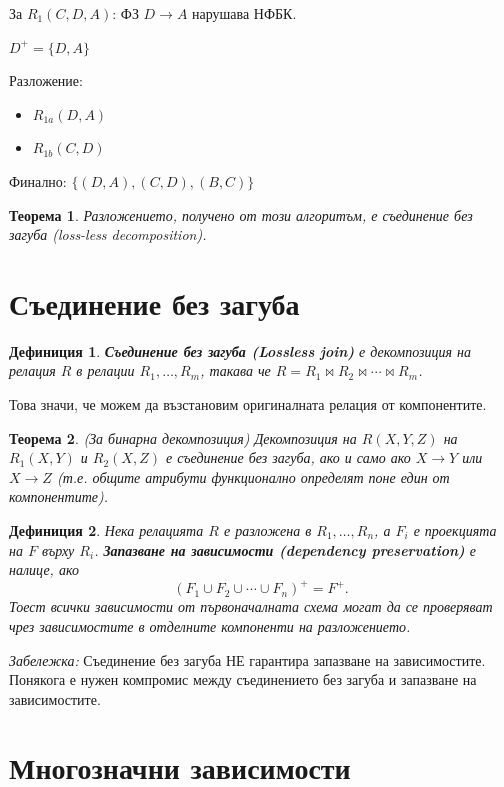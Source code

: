 \documentclass{scrartcl}
\newtheorem{definition}{Дефиниция}
\newtheorem{theorem}{Теорема}
\begin{document}
\begin{FlushLeft}
За $R_1(C, D, A)$: ФЗ $D \rightarrow A$ нарушава НФБК.

$D^+ = \{D, A\}$

Разложение:
\begin{itemize}
    \item $R_{1a}(D, A)$
    \item $R_{1b}(C, D)$
\end{itemize}

Финално: $\{(D, A), (C, D), (B, C)\}$

\begin{theorem}
Разложението, получено от този алгоритъм, е съединение без загуба (loss-less decomposition).
\end{theorem}

\section{Съединение без загуба}

\begin{definition}
\textbf{\textit{Съединение без загуба (Lossless join)}} е декомпозиция на релация $R$ в релации $R_1, \ldots, R_m$, такава че $R = R_1 \bowtie R_2 \bowtie \cdots \bowtie R_m$.
\end{definition}

Това значи, че можем да възстановим оригиналната релация от компонентите.

\begin{theorem}
(За бинарна декомпозиция) Декомпозиция на $R(X, Y, Z)$ на $R_1(X, Y)$ и $R_2(X, Z)$ е съединение без загуба, ако и само ако $X \rightarrow Y$ или $X \rightarrow Z$ (т.е. общите атрибути функционално определят поне един от компонентите).
\end{theorem}

\begin{definition}
Нека релацията $R$ е разложена в $R_1, \ldots, R_n$, а $F_i$ е проекцията на $F$ върху $R_i$. \textbf{\textit{Запазване на зависимости (dependency preservation)}} е налице, ако
$$
(F_1 \cup F_2 \cup \cdots \cup F_n)^+ = F^+.
$$
Тоест всички зависимости от първоначалната схема могат да се проверяват чрез зависимостите в отделните компоненти на разложението.
\end{definition}

\textit{Забележка:} Съединение без загуба НЕ гарантира запазване на зависимостите. Понякога е нужен компромис между съединението без загуба и запазване на зависимостите.

\section{Многозначни зависимости}


\end{FlushLeft}
\end{document}
